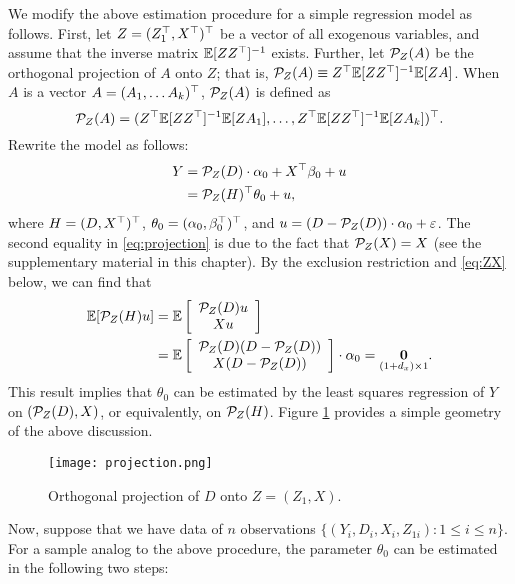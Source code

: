 \documentclass[11pt, A4paper, openany, uplatex]{book}
\begin{document}
We modify the above estimation procedure for a simple regression model as follows.
First, let $Z = (Z_1^\top, X^\top)^\top$ be a vector of all exogenous variables, and assume that the inverse matrix $\mathbb{E}[Z Z^\top]^{-1}$ exists.
Further, let $\mathcal{P}_Z(A)$ be the orthogonal projection of $A$ onto $Z$; that is, $\mathcal{P}_Z(A) \equiv Z^\top \mathbb{E}[ZZ^\top]^{-1}\mathbb{E}[Z A]$.
When $A$ is a vector $A = (A_1, \ldots A_k)^\top$, $\mathcal{P}_Z(A)$ is defined as 
\[
	\mathcal{P}_Z(A) = (Z^\top \mathbb{E}[Z Z^\top]^{-1} \mathbb{E}[ZA_1], \ldots , Z^\top \mathbb{E}[Z Z^\top]^{-1} \mathbb{E}[ZA_k])^\top.
\]
Rewrite the model as follows:
\begin{align}\label{eq:projection}
\begin{split}
	Y 
	& = \mathcal{P}_Z(D) \cdot \alpha_0 + X^\top \beta_0 +u \\
	& = \mathcal{P}_Z(H)^\top \theta_0 +u ,
\end{split}
\end{align}
where $H = (D, X^\top)^\top$, $\theta_0 = (\alpha_0, \beta_0^\top)^\top$, and $u = (D - \mathcal{P}_Z(D)) \cdot \alpha_0 + \varepsilon$.
The second equality in \eqref{eq:projection} is due to the fact that $\mathcal{P}_Z(X) = X$ (see the supplementary material in this chapter).
By the exclusion restriction and \eqref{eq:ZX} below, we can find that 
\begin{align*}
	\mathbb{E}[\mathcal{P}_Z(H) u] 
	& = \mathbb{E}\left[
	\begin{array}{c}
	\mathcal{P}_Z(D) u \\
	X u
	\end{array}
	\right] \\
		& = \mathbb{E}\left[
	\begin{array}{c}
	\mathcal{P}_Z(D) (D - \mathcal{P}_Z(D))  \\
	X (D - \mathcal{P}_Z(D))
	\end{array}
	\right] \cdot \alpha_0  = \underset{(1 + d_x) \times 1}{\mathbf{0}}.
\end{align*}
This result implies that $\theta_0$ can be estimated by the least squares regression of $Y$ on $(\mathcal{P}_Z(D), X)$, or equivalently, on $\mathcal{P}_Z(H)$.
Figure \ref{fig:geo2sls} provides a simple geometry of the above discussion.

\begin{figure}[h!]
	\begin{center}
		\texttt{[image: projection.png]}
		\caption{Orthogonal projection of $D$ onto $Z = (Z_1, X)$.}
		\label{fig:geo2sls}
	\end{center}
\end{figure}

Now, suppose that we have data of $n$ observations $\{(Y_i, D_i, X_i, Z_{1i}): 1 \le i \le n\}$.
For a sample analog to the above procedure, the parameter $\theta_0$ can be estimated in the following two steps:
\end{document}
